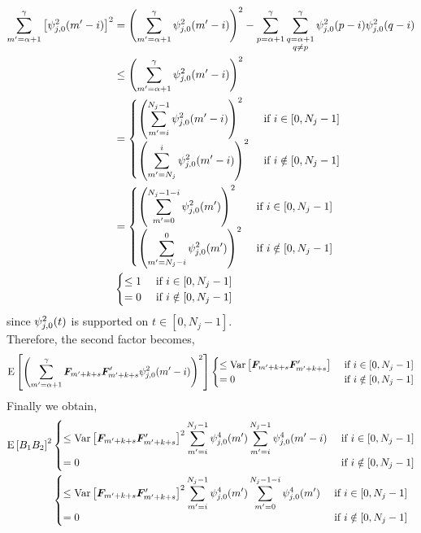 \documentclass[main_document.tex]{subfiles}
\begin{document}
\begin{align*}
	\sum_{m'=\alpha+1}^{\gamma} \left[ \psi_{j,0}^{2}(m'-i) \right]^{2} &= \left( \sum_{m'=\alpha+1}^{\gamma} \psi_{j,0}^{2}(m'-i) \right)^{2} - \sum_{p=\alpha+1}^{\gamma} \sum_{\substack{q=\alpha+1 \\ q \neq p}}^{\gamma} \squaredWavelet{j}{0}{p-i} \squaredWavelet{j}{0}{q-i} \\
	& \leq \left( \sum_{m'=\alpha+1}^{\gamma} \psi_{j,0}^{2}(m'-i) \right)^{2} \\
	& = 
		\begin{cases}
			\left( \sum_{m'=i}^{N_j-1} \psi_{j,0}^{2}(m'-i) \right)^{2} & \text{ if } i \in [0, N_j-1] \\
			\left( \sum_{m'=N_j}^{i} \psi_{j,0}^{2}(m'-i) \right)^{2} & \text{ if } i \notin [0, N_j-1] 
		\end{cases} \\
	& = 
		\begin{cases}
			\left( \sum_{m'=0}^{N_j-1-i} \psi_{j,0}^{2}(m') \right)^{2} & \text{ if } i \in [0, N_j-1] \\
			\left( \sum_{m'=N_j-i}^{0} \psi_{j,0}^{2}(m') \right)^{2} & \text{ if } i \notin [0, N_j-1] 
		\end{cases} \\
	& 
		\begin{cases}
			\leq 1 & \text{ if } i \in [0, N_j-1] \\
			= 0 & \text{ if } i \notin [0, N_j-1] 
		\end{cases}
\end{align*}
since $\psi_{j,0}^{2}(t)$ is supported on $t \in [0, N_j-1]$. \\
Therefore, the second factor becomes, 
\begin{align*}
	\E{\left( \sum_{m'=\alpha+1}^{\gamma} \factors{m'+k+s}\factors{m'+k+s}' \squaredWavelet{j}{0}{m'-i} \right)^{2}} 
	\begin{cases}
		\leq \Var{\factors{m'+k+s}\factors{m'+k+s}'} & \text{ if } i \in [0, N_j-1] \\
		= 0 & \text{ if } i \notin [0, N_j-1]
	\end{cases}
\end{align*}
Finally we obtain, 
\begin{align*}
	\E{B_1 B_2}^{2} &
	\begin{cases}
		\leq \Var{\factors{m'+k+s}\factors{m'+k+s}'}^{2} \sum_{m'=i}^{N_j-1}\waveletExp{j}{0}{m'}{4}\sum_{m'=i}^{N_j-1}\waveletExp{j}{0}{m'-i}{4} & \text{ if } i \in [0, N_j-1] \\
		= 0 & \text{ if } i \notin [0, N_j-1]
	\end{cases} \\
	& 	\begin{cases}
		\leq \Var{\factors{m'+k+s}\factors{m'+k+s}'}^{2} \sum_{m'=i}^{N_j-1}\waveletExp{j}{0}{m'}{4}\sum_{m'=0}^{N_j-1-i}\waveletExp{j}{0}{m'}{4} & \text{ if } i \in [0, N_j-1] \\
		= 0 & \text{ if } i \notin [0, N_j-1]
	\end{cases}
\end{align*}
\end{document}
